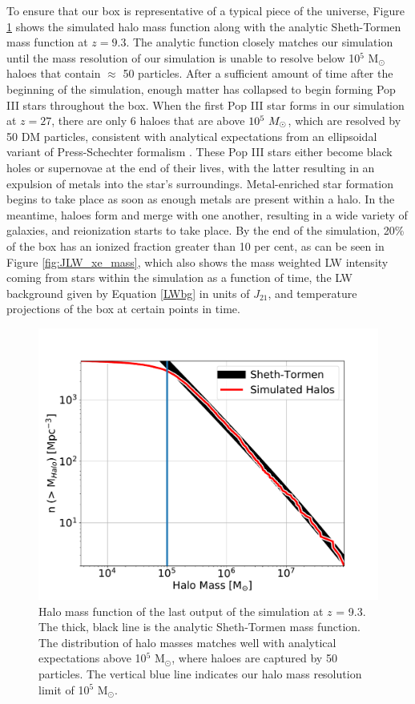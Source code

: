 \documentclass[fleqn,usenatbib]{mnras}
\begin{document}
To ensure that our box is representative of a typical piece of the universe, Figure \ref{fig:hmf} shows the simulated halo mass function along with the analytic Sheth-Tormen mass function at $z = 9.3$. The analytic function closely matches our simulation until the mass resolution of our simulation is unable to resolve below 10$^{5}$ M$_{\odot}$ haloes that contain $\approx$ 50 particles. After a sufficient amount of time after the beginning of the simulation, enough matter has collapsed to begin forming Pop III stars throughout the box. When the first Pop III star forms in our simulation at $z = 27$, there are only 6 haloes that are above $10^5~\Ms$, which are resolved by 50 DM particles, consistent with analytical expectations from an ellipsoidal variant of Press-Schechter formalism \citep{PS74,Sheth01}. These Pop III stars either become black holes or supernovae at the end of their lives, with the latter resulting in an expulsion of metals into the star's surroundings. Metal-enriched star formation begins to take place as soon as enough metals are present within a halo. In the meantime, haloes form and merge with one another, resulting in a wide variety of galaxies, and reionization starts to take place. By the end of the simulation, 20\% of the box has an ionized fraction greater than 10 per cent, as can be seen in Figure \ref{fig:JLW_xe_mass}, which also shows the mass weighted LW intensity coming from stars within the simulation as a function of time, the LW background given by Equation \ref{LWbg} in units of $J_{21}$, and temperature projections of the box at certain points in time. 

\begin{figure}
	\includegraphics[width=\columnwidth]{images/hmf.pdf}
    \caption{Halo mass function of the last output of the simulation at $z$ = 9.3. The thick, black line is the analytic Sheth-Tormen mass function. The distribution of halo masses matches well with analytical expectations above 10$^{5}$ M$_{\odot}$, where haloes are captured by 50 particles. The vertical blue line indicates our halo mass resolution limit of 10$^{5}$ M$_{\odot}$.}
    \label{fig:hmf}
\end{figure}
\end{document}
